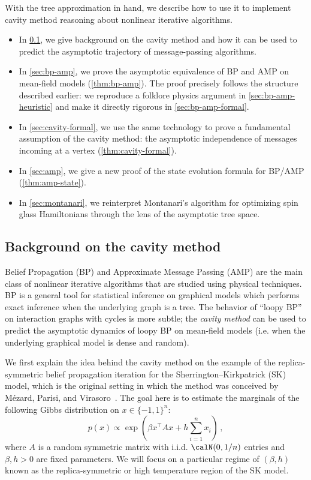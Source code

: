 \documentclass[12pt]{article}
\begin{document}
With the tree approximation in hand, we describe how to use it
to implement cavity method reasoning about nonlinear iterative algorithms.
\begin{itemize}
    \item In \cref{sec:intro-cavity}, we give background on the cavity method and how it can be used
    to predict the asymptotic trajectory of
    message-passing algorithms.
    \item In \cref{sec:bp-amp}, we prove the asymptotic equivalence of BP and AMP on mean-field models (\cref{thm:bp-amp}).
    The proof precisely follows the
    structure described earlier: we 
    reproduce a folklore physics argument in
    \cref{sec:bp-amp-heuristic} and make it directly
    rigorous in \cref{sec:bp-amp-formal}. 
    \item In \cref{sec:cavity-formal}, we use the same
    technology to prove a fundamental 
    assumption of the
    cavity method: the asymptotic independence of messages
    incoming at a vertex (\cref{thm:cavity-formal}).
    
    \item In \cref{sec:amp}, we give a new proof of the state
    evolution formula for BP/AMP (\cref{thm:amp-state}). 
    
    \item In \cref{sec:montanari}, we reinterpret Montanari's
    algorithm for optimizing spin glass Hamiltonians
    through the lens of the asymptotic tree space.
\end{itemize}

\subsection{Background on the cavity method}
\label{sec:intro-cavity}

Belief Propagation (BP) and Approximate Message Passing (AMP)
are the main class of nonlinear iterative algorithms that
are studied using physical techniques.
BP is a general tool for statistical inference on graphical models which performs exact inference when the underlying graph is a tree.
The behavior of ``loopy BP''
on interaction graphs with cycles is more subtle; the \emph{cavity method} can be used to predict the asymptotic dynamics of loopy BP on mean-field models (i.e. when the underlying graphical model is dense and random).

We first explain the idea behind the cavity method on the example
of the replica-symmetric belief propagation iteration
for the Sherrington--Kirkpatrick (SK) model, which is
the original setting in which the method was conceived
by Mézard, Parisi, and Virasoro~\cite[Chapter V]{mezard1987spinglasstheoryandbeyond}. The goal here is
to estimate the marginals of the following Gibbs
distribution on $x\in \{-1,1\}^n$:
\[
    p(x) \propto \exp\left(\beta x^\top A x + h\sum_{i=1}^n x_i\right)\,,
\]
where $A$ is a random symmetric matrix with i.i.d.
$\calN(0,1/n)$ entries and $\beta,h>0$ are fixed parameters.
We will focus on a particular regime of $(\beta,h)$ known as the replica-symmetric or high temperature region of the SK model.
\end{document}
